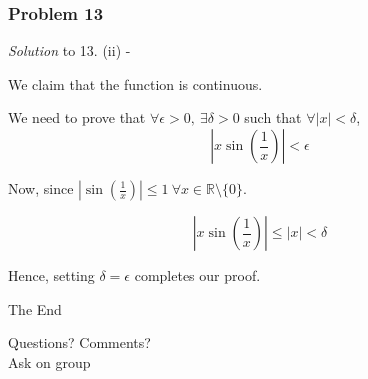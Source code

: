 \documentclass[
	11pt, %
]{beamer}
\begin{document}
\begin{frame}[t]
	\frametitle{Problem 13}

	\textit{Solution} to 13. (ii) -

	\bigskip

	We claim that the function is continuous.

	\medskip

	We need to prove that $\forall \epsilon > 0, ~ \exists \delta > 0$ such that $\forall |x| < \delta$, 
	\[|x \sin(\frac1x)| < \epsilon\]

	Now, since $|\sin(\frac1x)| \leq 1 ~ \forall x \in \mathbb{R} \setminus \{0\}$.

	\[ |x \sin(\frac1x)| \leq |x| < \delta \]

	Hence, setting $\delta = \epsilon$ completes our proof.

	

\end{frame}



\begin{frame}[plain] %
	\begin{center}
		{\Huge The End}
		
		\bigskip\bigskip %
		
		{\LARGE Questions? Comments? \\ Ask on group}
	\end{center}
\end{frame}

\end{document}
